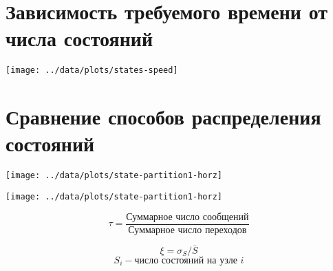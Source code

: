 \documentclass[12pt]{article}
\begin{document}
\section{Зависимость требуемого времени от числа состояний}
\label{sec:states-time}

\begin{center}
  \texttt{[image: ../data/plots/states-speed]}
\end{center}



\section{Сравнение способов распределения состояний}
\label{sec:partition-cmp}

\begin{minipage}[m]{0.5\linewidth}
  \texttt{[image: ../data/plots/state-partition1-horz]}  
\end{minipage}
\begin{minipage}[m]{0.5\linewidth}
  \texttt{[image: ../data/plots/state-partition1-horz]}  
\end{minipage}

\small{
  \begin{minipage}[m]{0.5\linewidth}
    $$ \tau = \frac{\text{Суммарное число сообщений}}{\text{Суммарное число переходов}} $$    
  \end{minipage}
  \begin{minipage}[m]{0.5\linewidth}
    $$ \xi = \sigma_S/\overline{S}$$ $$ S_i - \text{число состояний на узле~} i $$
  \end{minipage}
}
\end{document}
